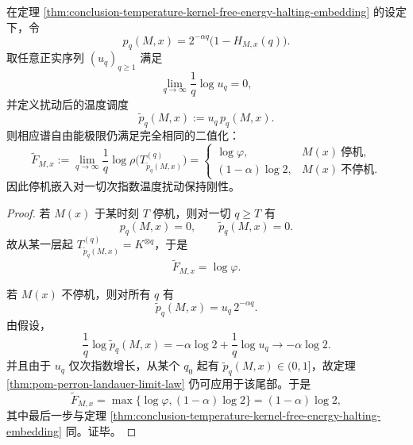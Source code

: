\begin{theorem}[停机嵌入对次指数温度扰动的刚性]\label{thm:conclusion-temperature-kernel-subexponential-perturbation-rigidity}
在定理 \ref{thm:conclusion-temperature-kernel-free-energy-halting-embedding} 的设定下，令
\[
p_q(M,x)=2^{-\alpha q}\bigl(1-H_{M,x}(q)\bigr).
\]
取任意正实序列 \((u_q)_{q\ge 1}\) 满足
\[
\lim_{q\to\infty}\frac{1}{q}\log u_q=0,
\]
并定义扰动后的温度调度
\[
\widetilde p_q(M,x):=u_q\,p_q(M,x).
\]
则相应谱自由能极限仍满足完全相同的二值化：
\[
\widetilde F_{M,x}
:=
\lim_{q\to\infty}\frac1q\log\rho\!\bigl(T^{(q)}_{\widetilde p_q(M,x)}\bigr)
=
\begin{cases}
\log\varphi, & M(x)\ \text{停机},\\[2pt]
(1-\alpha)\log 2, & M(x)\ \text{不停机}.
\end{cases}
\]
因此停机嵌入对一切次指数温度扰动保持刚性。
\end{theorem}
\begin{proof}
若 \(M(x)\) 于某时刻 \(T\) 停机，则对一切 \(q\ge T\) 有
\[
p_q(M,x)=0,
\qquad
\widetilde p_q(M,x)=0.
\]
故从某一层起
\(
T^{(q)}_{\widetilde p_q(M,x)}=K^{\otimes q}
\)，于是
\[
\widetilde F_{M,x}=\log\varphi.
\]

若 \(M(x)\) 不停机，则对所有 \(q\) 有
\[
\widetilde p_q(M,x)=u_q\,2^{-\alpha q}.
\]
由假设，
\[
\frac1q\log \widetilde p_q(M,x)
=
-\alpha\log 2+\frac1q\log u_q
\longrightarrow
-\alpha\log 2.
\]
并且由于 \(u_q\) 仅次指数增长，从某个 \(q_0\) 起有 \(\widetilde p_q(M,x)\in(0,1]\)，故定理 \ref{thm:pom-perron-landauer-limit-law} 仍可应用于该尾部。于是
\[
\widetilde F_{M,x}
=
\max\{\log\varphi,(1-\alpha)\log 2\}
=(1-\alpha)\log 2,
\]
其中最后一步与定理 \ref{thm:conclusion-temperature-kernel-free-energy-halting-embedding} 同。证毕。
\end{proof}

